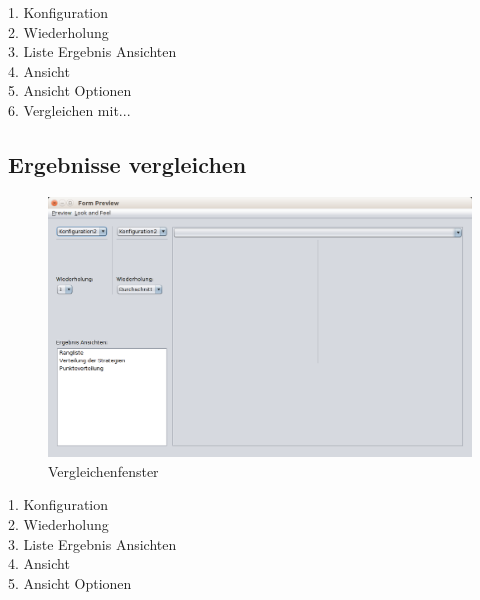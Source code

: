 \begin{description}

\item[1. Konfiguration] 

\item[2. Wiederholung] 

\item[3. Liste Ergebnis Ansichten] 

\item[4. Ansicht] 

\item[5. Ansicht Optionen] 

\item[6. Vergleichen mit...] 

\end{description}

\pagebreak


\subsection{Ergebnisse vergleichen}

\begin{figure}[hp] 
  \centering
     \includegraphics[width=1.15\textwidth]{GUI_Entwurf/Vergleichfenster.png}
  \caption{Vergleichenfenster}
  \label{fig:Bild1}
\end{figure}

\begin{description}

\item[1. Konfiguration] 

\item[2. Wiederholung] 

\item[3. Liste Ergebnis Ansichten] 

\item[4. Ansicht] 

\item[5. Ansicht Optionen] 

\end{description}



